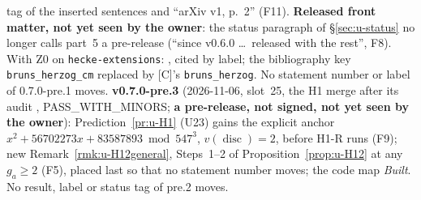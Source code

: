 \documentclass[11pt]{article}
\begin{document}
tag of the inserted sentences and ``arXiv v1, p.~2'' (F11). \textbf{Released front matter, not yet seen by the owner}: the status paragraph of \S\ref{sec:u-status} no longer calls
part~5 a pre-release (``since v0.6.0 \dots\ released with the rest'', F8). With Z0 on \texttt{hecke-extensions}: ,  cited by label; the
bibliography key \texttt{bruns\_herzog\_cm} replaced by [C]'s \texttt{bruns\_herzog}. No statement number or label of 0.7.0-pre.1 moves.
\textbf{v0.7.0-pre.3} (2026-11-06, slot~25, the H1 merge after its audit , PASS\_WITH\_MINORS; \textbf{a pre-release, not signed,
not yet seen by the owner}): Prediction~\ref{pr:u-H1} (U23) gains the explicit anchor $x^{2}+56702273x+83587893\bmod547^{3}$, $v(\operatorname{disc})=2$, before H1-R runs (F9);
new Remark~\ref{rmk:u-H12general}, Steps~1--2 of Proposition~\ref{prop:u-H12} at any $g_a\ge2$ (F5), placed last so that no statement number moves; the code map \emph{Built}. No result,
label or status tag of pre.2 moves.
\end{document}
